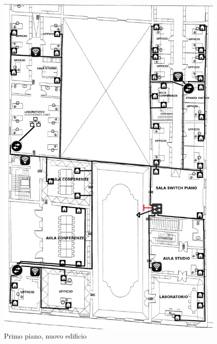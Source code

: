 \documentclass[11pt, a4paper, oneside]{article}
\begin{document}
			\begin{figure}[H]
				\caption{Primo piano, nuovo edificio}
				\includegraphics[scale=0.2]{architecture-006.png}
			\end{figure}
\end{document}
